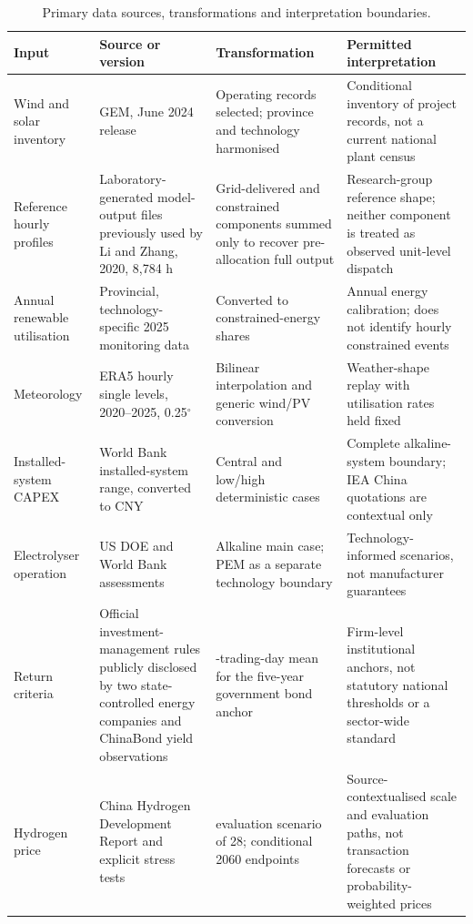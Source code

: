 \documentclass[pdflatex,sn-nature]{sn-jnl}
\begin{document}
\begin{table}[t]
\caption{Primary data sources, transformations and interpretation boundaries.}\label{tab:data}
\centering
\footnotesize
\begin{tabularx}{\textwidth}{>{\raggedright\arraybackslash}p{}>{\raggedright\arraybackslash}p{}>{\raggedright\arraybackslash}X>{\raggedright\arraybackslash}p{}}
\toprule
Input & Source or version & Transformation & Permitted interpretation \\
\midrule
Wind and solar inventory & GEM, June 2024 release\cite{gem2024} & Operating records selected; province and technology harmonised & Conditional inventory of project records, not a current national plant census \\
Reference hourly profiles & Laboratory-generated model-output files previously used by Li and Zhang, 2020, 8,784 h\cite{li2026} & Grid-delivered and constrained components summed only to recover pre-allocation full output & Research-group reference shape; neither component is treated as observed unit-level dispatch \\
Annual renewable utilisation & Provincial, technology-specific 2025 monitoring data\cite{renewable2025} & Converted to constrained-energy shares & Annual energy calibration; does not identify hourly constrained events \\
Meteorology & ERA5 hourly single levels, 2020--2025, 0.25$^\circ$\cite{hersbach2020,era5data} & Bilinear interpolation and generic wind/PV conversion & Weather-shape replay with utilisation rates held fixed \\
Installed-system CAPEX & World Bank installed-system range, converted to CNY\cite{worldbank2026} & Central and low/high deterministic cases & Complete alkaline-system boundary; IEA China quotations are contextual only\cite{iea2025} \\
Electrolyser operation & US DOE and World Bank assessments\cite{doe2024,worldbank2026} & Alkaline main case; PEM as a separate technology boundary & Technology-informed scenarios, not manufacturer guarantees \\
Return criteria & Official investment-management rules publicly disclosed by two state-controlled energy companies and ChinaBond yield observations\cite{changyuan2026,huadian2025,chinabond2026} & 20-trading-day mean for the five-year government bond anchor & Firm-level institutional anchors, not statutory national thresholds or a sector-wide standard \\
Hydrogen price & China Hydrogen Development Report and explicit stress tests\cite{nea2025hydrogen} & 2026 evaluation scenario of 28; conditional 2060 endpoints & Source-contextualised scale and evaluation paths, not transaction forecasts or probability-weighted prices \\

\end{tabularx}
\end{table}
\end{document}
